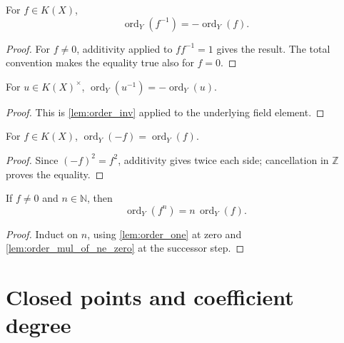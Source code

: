 \begin{lemma}
  \label{lem:order_inv}
  \leanok
  For \(f\in K(X)\),
  \[
    \operatorname{ord}_Y(f^{-1})=-\operatorname{ord}_Y(f).
  \]
\end{lemma}
\begin{proof}
  \leanok
  For \(f\neq0\), additivity applied to \(ff^{-1}=1\) gives the result.  The
  total convention makes the equality true also for \(f=0\).
\end{proof}

\begin{lemma}
  \label{lem:order_units_inv}
  \leanok
  For \(u\in K(X)^\times\),
  \(\operatorname{ord}_Y(u^{-1})=-\operatorname{ord}_Y(u)\).
\end{lemma}
\begin{proof}
  \leanok
  This is \cref{lem:order_inv} applied to the underlying field element.
\end{proof}

\begin{lemma}
  \label{lem:order_neg}
  \leanok
  For \(f\in K(X)\),
  \(\operatorname{ord}_Y(-f)=\operatorname{ord}_Y(f)\).
\end{lemma}
\begin{proof}
  \leanok
  Since \((-f)^2=f^2\), additivity gives twice each side; cancellation in
  \(\mathbb Z\) proves the equality.
\end{proof}

\begin{lemma}
  \label{lem:order_pow_of_ne_zero}
  \leanok
  If \(f\neq0\) and \(n\in\mathbb N\), then
  \[
    \operatorname{ord}_Y(f^n)=n\,\operatorname{ord}_Y(f).
  \]
\end{lemma}
\begin{proof}
  \leanok
  Induct on \(n\), using \cref{lem:order_one} at zero and
  \cref{lem:order_mul_of_ne_zero} at the successor step.
\end{proof}

\section{Closed points and coefficient degree}

